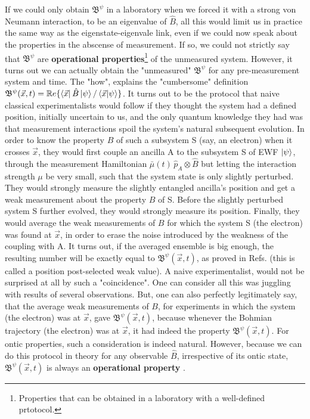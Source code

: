 \documentclass[11pt, a4paper]{article} %
\newcommand{\B}{\mathfrak{B}}
\begin{document}
If we could only obtain $\B^\psi$ in a laboratory when we forced it with a strong von Neumann interaction, to be an eigenvalue of $\hat{B}$, all this would limit us in practice the same way as the eigenstate-eigenvale link, even if we could now speak about the properties in the abscense of measurement. If so, we could not strictly say that $\B^\psi$ are {\bf operational properties}\footnote{Properties that can be obtained in a laboratory with a well-defined prtotocol.} of the unmeasured system. However, it turns out we can actually obtain the "unmeasured" $\B^\psi$ for any pre-measurement system and time. The "how", explains the "cumbersome" definition $\B^\psi(\vec{x},t)=\mathbb{R}e\{\bra{\vec{x}}\hat{B}\ket{\psi}/\bra{\vec{x}}\ket{\psi}\}$. It turns out to be the protocol that naive classical experimentalists \cite{WisemanVel} would follow if they thought the system had a defined position, initially uncertain to us, and the only quantum knowledge they had was that measurement interactions spoil the system's natural subsequent evolution. In order to know the property $B$ of such a subsystem S (say, an electron) when it crosses $\vec{x}$, they would first couple an ancilla A to the subsystem S of EWF $\ket{\psi}$, through the measurement Hamiltonian $\bar{\mu}(t)\,\hat{p}_A\otimes\hat{B}$ but letting the interaction strength $\mu$ be very small, such that the system state is only slightly perturbed. They would strongly measure the slightly entangled ancilla's position and get a weak measurement about the property $B$ of S. Before the slightly perturbed system S further evolved, they would strongly measure its position. Finally, they would average the weak measurements of $B$ for which the system S (the electron) was found at $\vec{x}$, in order to erase the noise introduced by the weakness of the coupling with A. It turns out, if the averaged ensemble is big enough, the resulting number will be exactly equal to $\B^\psi(\vec{x},t)$, as proved in Refs. \cite{Weak, DevInPosition1} (this is called a position post-selected weak value). A naive experimentalist, would not be surprised at all by such a "coincidence". One can consider all this was juggling with results of several observations. But, one can also perfectly legitimately say, that the average weak measurements of $B$, for experiments in which the system (the electron) was at $\vec{x}$, gave $\B^\psi(\vec{x},t)$, because whenever the Bohmian trajectory (the electron) was at $\vec{x}$, it had indeed the property $\B^\psi(\vec{x},t)$. For ontic properties, such a consideration is indeed natural. However, because we can do this protocol in theory for any observable $\hat{B}$, irrespective of its ontic state, $\B^\psi(\vec{x},t)$ is always an {\bf operational property} \cite{DevInPosition1, DevInPosition2}.\vspace{-0.15cm}
\end{document}
